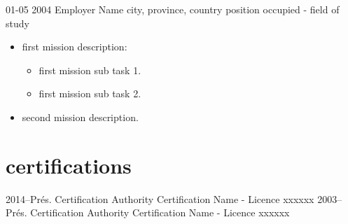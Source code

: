 \documentclass[print]{friggos-cv} %
\begin{document}
\begin{entrylist}
  \entryBul
    {01-05 2004}
    {Employer Name}
    {city, province, country}
    {position occupied - field of study}
    {
     \begin{itemize}[leftmargin=*]
       \setlength\itemsep{0pt}       
       \item first mission description:
         \begin{itemize}
           \item first mission sub task 1.
           \item first mission sub task 2.
         \end{itemize}
       \item second mission description.
     \end{itemize}
     }
\end{entrylist}


\section{certifications}
  \begin{entrylist}
    \entryFULL
      {2014--Prés.}
      {Certification Authority}
      {}
      {Certification Name - Licence xxxxxx}
      {}
    \entryFULL
      {2003--Prés.}
      {Certification Authority}
      {}
      {Certification Name - Licence xxxxxx}
      {}
\end{entrylist}

%
\end{document}
